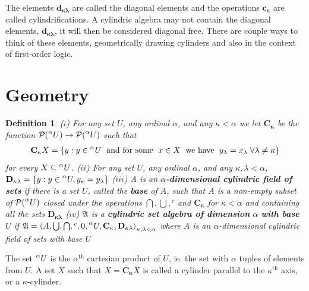 \documentclass[12pt,a4paper]{article}
\newtheorem{definition}[theorem]{Definition}
\begin{document}
The elements $\mathbf{d_{\kappa\lambda}}$ are called the diagonal elements and the operations $\mathbf{c_\kappa}$ are called cylindrifications. A cylindric algebra may not contain the diagonal elements, $\mathbf{d_{\kappa\lambda}}$, it will then be considered diagonal free. There are couple ways to think of these elements, geometrically drawing cylinders and also in the context of first-order logic. 

\section{Geometry}

\begin{definition}
($i$) For any set $U$, any ordinal $\alpha$, and any $\kappa<\alpha$ we let $\mathbf{C_\kappa}$ be the function $\mathcal{P}(\prescript{\alpha}{}{U})\to\mathcal{P}(\prescript{\alpha}{}{U})$ such that 
\begin{align*}
    \mathbf{C_\kappa}X =\{y:y\in \prescript{\alpha}{}{U} \text{\; and for some \;} x\in X\text{\; we have  \;} y_\lambda = x_\lambda \; \forall \lambda\neq\kappa\}
\end{align*}
for every $X\subseteq \prescript{\alpha}{}{U}$.\newline
($ii$) For any set $U$, any ordinal $\alpha$, and any $\kappa,\lambda<\alpha$, $\mathbf{D_{\kappa\lambda}}=\{y:y\in\prescript{\alpha}{}{U},y_\kappa=y_\lambda\}$\newline
($iii$) A is an $\alpha$\textbf{-dimensional cylindric field of sets} if there is a set $U$, called the \textbf{base} of $A$, such that $A$ is a non-empty subset of $\mathcal{P}(\prescript{\alpha}{}{U})$ closed under the operations $\bigcap,\bigcup,{}^c$ and $\mathbf{C_\kappa}$ for $\kappa<\alpha$ and containing all the sets $\mathbf{D_{\kappa\lambda}}$ \newline
($iv$) $\mathfrak{A}$ is a \textbf{cylindric set algebra of dimension} $\alpha$ \textbf{with base } $U$ if $\mathfrak{A}=\left<A,\bigcup,\bigcap,{}^c,0,\prescript{\alpha}{}{U},\mathbf{C_\kappa},\mathbf{D_{\kappa\lambda}}\right>_{\kappa,\lambda<\alpha}$ where $A$ is an $\alpha$-dimensional cylindric field of sets with base $U$
\end{definition}

The set $\prescript{\alpha}{}{U}$ is the $\alpha^\text{th}$ cartesian product of $U$, ie. the set with $\alpha$ tuples of elements from $U$. A set $X$ such that $X=\mathbf{C_\kappa}X$ is called a cylinder parallel to the $\kappa^\text{th}$ axis, or a $\kappa$-cylinder.
\newline
\end{document}
